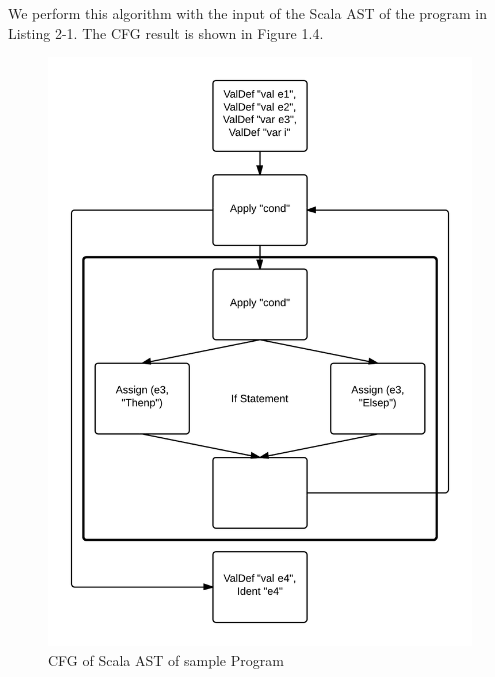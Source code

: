 We perform this algorithm with the input of the Scala AST of the program in Listing 2-1. The CFG result is shown in Figure 1.4. 

\begin{figure}[h!]
\centering
\includegraphics[width=0.7\linewidth]{FinalGraph}
\caption{CFG of Scala AST of sample Program}
\label{fig:FinalGraph}
\end{figure}



